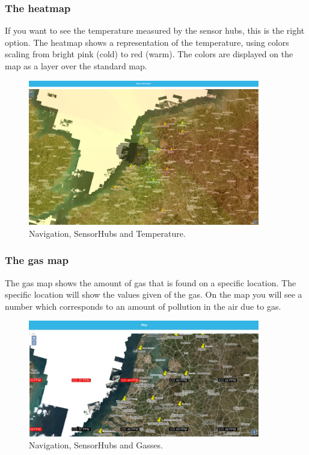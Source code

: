 \documentclass[a4paper]{article}
\begin{document}
\subsubsection{The heatmap}
If you want to see the temperature measured by the sensor hubs, this is the right option.
The heatmap shows a representation of the temperature, using colors scaling from bright pink (cold) to red (warm). The colors are displayed on the map as a layer over the standard map.
\begin{figure}[h!]
  \caption{Navigation, SensorHubs and Temperature.}
  \centering
  \includegraphics[width=0.9\textwidth]{heatmap}
\end{figure}
\newline

\subsubsection{The gas map} 
The gas map shows the amount of gas that is found on a specific location. The specific location will show the values given of the gas. On the map you will see a number which corresponds to an amount of pollution in the air due to gas.
\begin{figure}[h!]
  \caption{Navigation, SensorHubs and Gasses.}
  \centering
  \includegraphics[width=0.9\textwidth]{gasmap}
\end{figure}
\newline
\end{document}

